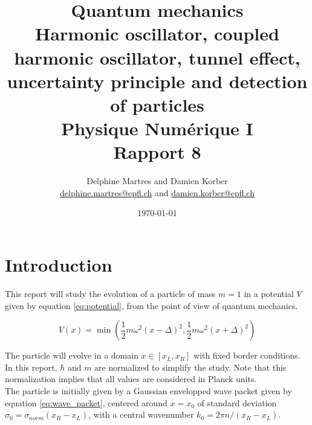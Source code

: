 \documentclass[a4paper,12pt,twoside]{article}
\newcommand{\mail}[1]{{\href{mailto:#1}{#1}}}
\newcommand{\bracket}[1]{\left(#1\right)}
\newcommand{\sqbracket}[1]{\left[#1\right]}
\begin{document}
\title{Quantum mechanics\\{\normalsize Harmonic oscillator, coupled harmonic oscillator, tunnel effect, uncertainty principle and detection of particles}\\{\small Physique Numérique I}\\{\small Rapport 8}}
\date{\today}
\author{Delphine Martres and Damien Korber\\{\small \mail{delphine.martres@epfl.ch} and \mail{damien.korber@epfl.ch}}}

\maketitle
\tableofcontents %


\baselineskip=16pt
\parindent=15pt
\parskip=5pt
\newpage


\section{Introduction}
  This report will study the evolution of a particle of mass $m=1$ in a potential $V$ given by equation \eqref{eq:potential}, from the point of view of quantum mechanics.

  \begin{equation}
    V(x) = \min\bracket{\frac{1}{2}m\omega^2(x-\Delta)^2, \frac{1}{2}m\omega^2(x+\Delta)^2}
    \label{eq:potential}
  \end{equation}

  The particle will evolve in a domain $x\in\sqbracket{x_L, x_R}$ with fixed border conditions.
  In this report, $\hbar$ and $m$ are normalized to simplify the study.
  Note that this normalization implies that all values are considered in Planck units.\\

  The particle is initially given by a Gaussian envelopped wave packet given by equation \eqref{eq:wave_packet}, centered around $x=x_0$ of standard deviation $\sigma_0 = \sigma_{norm}(x_R - x_L)$, with a central wavenumber $k_0 = 2\pi n/(x_R - x_L)$.
\end{document}
